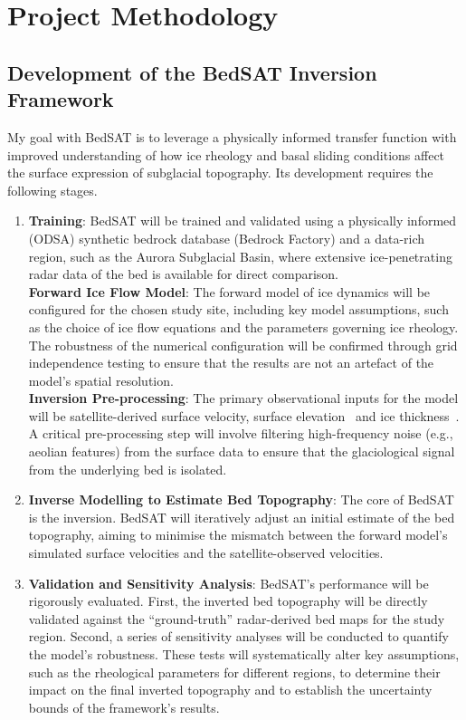 \chapter{Project Methodology}

\section{Development of the BedSAT Inversion Framework}

My goal with BedSAT is to leverage a physically informed transfer function with improved understanding of how ice rheology and basal sliding conditions affect the surface expression of subglacial topography. Its development requires the following stages.

\begin{enumerate}
\item{\textbf{Training}}:
BedSAT will be trained and validated using a physically informed (ODSA) synthetic bedrock database (Bedrock Factory) and a data-rich region, such as the Aurora Subglacial Basin, where extensive ice-penetrating radar data of the bed is available for direct comparison.\\
\textbf{Forward Ice Flow Model}:
The forward model of ice dynamics will be configured for the chosen study site, including key model assumptions, such as the choice of ice flow equations and the parameters governing ice rheology. The robustness of the numerical configuration will be confirmed through grid independence testing to ensure that the results are not an artefact of the model's spatial resolution.\\
\textbf{Inversion Pre-processing}:
The primary observational inputs for the model will be satellite-derived surface velocity, surface elevation~\cite{Rignot_2017, REMA} and ice thickness~\cite{Young_2011, ICECAP}. A critical pre-processing step will involve filtering high-frequency noise (e.g., aeolian features) from the surface data to ensure that the glaciological signal from the underlying bed is isolated.

\item{\textbf{Inverse Modelling to Estimate Bed Topography}}:
The core of BedSAT is the inversion. BedSAT will iteratively adjust an initial estimate of the bed topography, aiming to minimise the mismatch between the forward model's simulated surface velocities and the satellite-observed velocities.

\item{\textbf{Validation and Sensitivity Analysis}}:
BedSAT's performance will be rigorously evaluated. First, the inverted bed topography will be directly validated against the ``ground-truth'' radar-derived bed maps for the study region. Second, a series of sensitivity analyses will be conducted to quantify the model's robustness. These tests will systematically alter key assumptions, such as the rheological parameters for different regions, to determine their impact on the final inverted topography and to establish the uncertainty bounds of the framework's results.
\end{enumerate}

